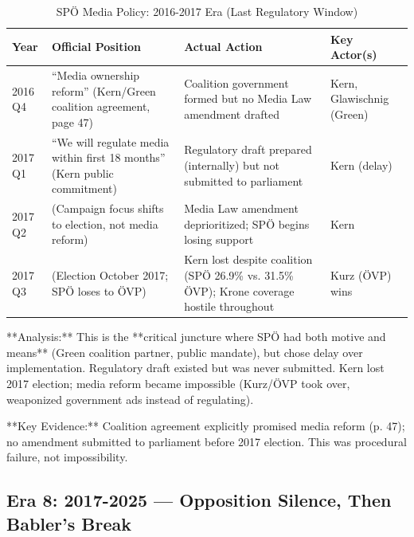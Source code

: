 \begin{table}[h]
\centering
\small
\caption{SPÖ Media Policy: 2016-2017 Era (Last Regulatory Window)}
\label{tab:bh-media-policy-2016-2017}
\begin{tabular}{|p{2.5cm}|p{3cm}|p{3cm}|p{4cm}|}
\hline
\textbf{Year} & \textbf{Official Position} & \textbf{Actual Action} & \textbf{Key Actor(s)} \\
\hline
2016 Q4 & ``Media ownership reform'' (Kern/Green coalition agreement, page 47) & Coalition government formed but no Media Law amendment drafted & Kern, Glawischnig (Green) \\
\hline
2017 Q1 & ``We will regulate media within first 18 months'' (Kern public commitment) & Regulatory draft prepared (internally) but not submitted to parliament & Kern (delay) \\
\hline
2017 Q2 & (Campaign focus shifts to election, not media reform) & Media Law amendment deprioritized; SPÖ begins losing support & Kern \\
\hline
2017 Q3 & (Election October 2017; SPÖ loses to ÖVP) & Kern lost despite coalition (SPÖ 26.9\% vs. 31.5\% ÖVP); Krone coverage hostile throughout & Kurz (ÖVP) wins \\
\hline
\end{tabular}
\end{table}

**Analysis:** This is the **critical juncture where SPÖ had both motive and means** (Green coalition partner, public mandate),
but chose delay over implementation. Regulatory draft existed but was never submitted. Kern lost 2017 election; media reform became impossible
(Kurz/ÖVP took over, weaponized government ads instead of regulating).

**Key Evidence:** Coalition agreement explicitly promised media reform (p. 47); no amendment submitted to parliament before 2017 election.
This was procedural failure, not impossibility.

\subsection*{Era 8: 2017-2025 --- Opposition Silence, Then Babler's Break}

